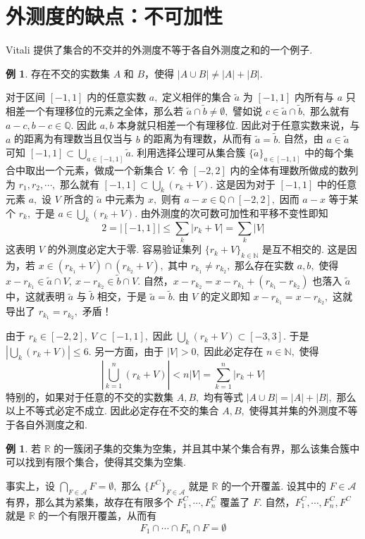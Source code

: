 \documentclass[12pt, a4paper, oneside]{book}
\numberwithin{figure}{section}
\theoremstyle{definition}
\newtheorem{example}[theorem]{例}
\begin{document}
\section{外测度的缺点：不可加性} Vitali 提供了集合的不交并的外测度不等于各自外测度之和的一个例子. 
\begin{example}\label{ex:non_additivity_of_outer_measure}
    存在不交的实数集 $A$ 和 $B$，使得 $|A\cup B|\neq |A|+|B|.$
\end{example}
对于区间 $[-1,1]$ 内的任意实数 $a,$ 定义相伴的集合 $\tilde a$ 为 $[-1,1]$ 内所有与 $a$ 只相差一个有理移位的元素之全体，那么若 $\tilde a\cap\tilde b\neq \emptyset,$ 譬如说 $c\in\tilde a\cap\tilde b,$ 那么就有 
$a-c,b-c\in\mathbb Q.$ 因此 $a,b$ 本身就只相差一个有理移位. 因此对于任意实数来说，与 $a$ 的距离为有理数当且仅当与 $b$ 的距离为有理数，从而有 $\tilde a=\tilde b.$ 
自然，由 $a\in\tilde a$ 可知 $[-1,1]\subset \bigcup_{a\in [-1,1]}\tilde a.$ 利用选择公理可从集合簇 $\{\tilde a\}_{a\in [-1,1]}$ 中的每个集合中取出一个元素，做成一个新集合 $V.$ 令 $[-2,2]$ 内的全体有理数所做成的数列为 $r_1,r_2,\cdots,$ 
那么就有 $[-1,1]\subset\bigcup_{k} (r_k+V).$ 这是因为对于 $[-1,1]$ 中的任意元素 $a,$ 设 $V$ 所含的 $\tilde a$ 中元素为 $x,$ 则有 $a-x\in\mathbb Q\cap [-2,2],$ 因而 $a-x$ 等于某个 $r_k,$ 于是 $a\in \bigcup_{k} (r_k+V).$ 
由外测度的次可数可加性和平移不变性即知
\begin{equation}
    2=|[-1,1]|\leq\sum_k |r_k+V|=\sum_k |V|
\end{equation}
这表明 $V$ 的外测度必定大于零. 容易验证集列 $\{r_k+V\}_{k\in\mathbb N}$ 是互不相交的. 这是因为，若 $x\in (r_{k_1}+V)\cap (r_{k_2}+V),$ 其中 $r_{k_1}\neq r_{k_2},$ 那么存在实数 $a,b,$ 使得 $x-r_{k_1}\in \tilde a\cap V,\ x-r_{k_2}\in\tilde b\cap V.$ 自然，$x-r_{k_2}=x-r_{k_1}+(r_{k_1}-r_{k_2})$ 也落入 $\tilde a$ 中，这就表明 $\tilde a$ 与 $\tilde b$ 相交，于是 $\tilde a=\tilde b.$ 由 $V$ 的定义即知 $x-r_{k_1}=x-r_{k_2},$ 这就导出了 $r_{k_1}=r_{k_2},$ 矛盾！

由于 $r_k\in [-2,2],\ V\subset [-1,1],$ 因此 $\bigcup_k (r_k+V)\subset [-3,3].$ 于是 $|\bigcup_k (r_k+V)|\leq 6.$ 另一方面，由于 $|V|>0,$ 因此必定存在 $n\in\mathbb N,$ 使得 
\begin{equation}
    \left|\bigcup_{k=1}^n (r_k+V)\right|< n|V|=\sum_{k=1}^n |r_k+V|
\end{equation}
特别的，如果对于任意的不交的实数集 $A,B,$ 均有等式 $|A\cup B|=|A|+|B|,$ 那么以上不等式必定不成立. 因此必定存在不交的集合 $A,B,$ 使得其并集的外测度不等于各自外测度之和.

\begin{example}
    若 $\mathbb R$ 的一簇闭子集的交集为空集，并且其中某个集合有界，那么该集合簇中可以找到有限个集合，使得其交集为空集.
\end{example}
事实上，设 $\bigcap_{F\in\mathcal A}F=\emptyset,$ 那么 $\{F^C\}_{F\in\mathcal A}$ 就是 $\mathbb R$ 的一个开覆盖. 设其中的 $F\in \mathcal A$ 有界，那么其为紧集，故存在有限多个 $F_1^C,\cdots,F_n^C$ 覆盖了 $F.$ 自然，$F_1^C,\cdots,F_n^C,F^C$ 就是 $\mathbb R$ 的一个有限开覆盖，从而有 
\begin{equation}
    F_1\cap\cdots\cap F_n\cap F=\emptyset
\end{equation}
\end{document}
